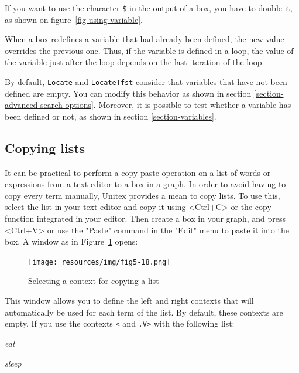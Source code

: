 \noindent If you want to use the character \verb+$+ in the output of a box, you
have to double it, as shown on figure~\ref{fig-using-variable}.

\bigskip
\noindent When a box redefines a variable that had already been defined,
 the new value overrides the previous one.
Thus, if the variable is defined in a loop,
the value of the variable just after the loop depends on the last iteration of the loop.

\bigskip
\noindent By default, \verb+Locate+ and \verb+LocateTfst+ 
consider that variables that have not been defined are empty.
You can
modify this behavior as shown in section \ref{section-advanced-search-options}.
Moreover, it is possible to test whether a variable has been defined or not, as
shown in section \ref{section-variables}.

\subsection{Copying lists}

It can be practical to perform a copy-paste operation on a list of words or
expressions from a text editor to a box in a graph. In order to avoid having to
copy every term manually, Unitex provides a mean to copy lists. To use this,
select the list in your text editor and copy it using <Ctrl+C> or the copy
function integrated in your editor. Then create a box in your graph, and press
<Ctrl+V> or use the "Paste" command in the "Edit" menu to paste it into the box.
A window as in Figure~\ref{fig-setting-contexts-for-multiple-copy}
opens:

\bigskip
\begin{figure}[!ht]
\begin{center}
\texttt{[image: resources/img/fig5-18.png]}
\caption{Selecting a context for copying a list\label{fig-setting-contexts-for-multiple-copy}}
\end{center}
\end{figure}

\noindent This window allows you to define the left and right contexts that will
automatically be used for each term of the list. By default, these contexts are
empty. If you use the contexts  \verb+<+ and \verb+.V>+ with the following list:

\bigskip
\textit{eat}

\textit{sleep}

